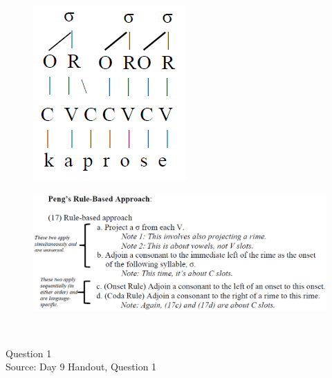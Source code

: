 \documentclass[12pt]{article}
\begin{document}
\begin{figure}[H]
\includegraphics{../images/pengrules_kaprose_no.png}
\end{figure}
\begin{figure}[H]
\includegraphics{../images/peng_rules.png}
\end{figure}

\newpage

\begin{center}
\textbf{{\color{red}{\HUGE END OF EXAM}}}\\

\end{center}
\newpage

\begin{center}
\textbf{{\color{blue}{\HUGE START OF EXAM\\}}}

\textbf{{\color{blue}{\HUGE Student ID: 8350\\}}}

\textbf{{\color{blue}{\HUGE 5:00 - 5:20 PM\\}}}

\end{center}
\newpage

{\large Question 1}\\

Source: Day 9 Handout, Question 1\\
\end{document}
